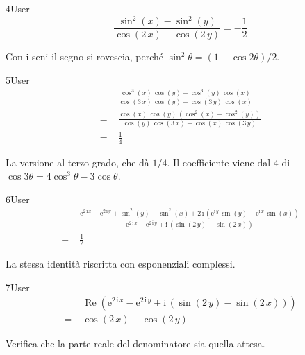 \begin{espr}{4}{User}{\verificata}
\[
\frac{\sin^{2}\!\left(x\right) - \sin^{2}\!\left(y\right)}{\cos\!\left(2\, x\right) - \cos\!\left(2\, y\right)} = -\frac{1}{2}
\]
\end{espr}
Con i seni il segno si rovescia, perché $\sin^2\theta=(1-\cos2\theta)/2$.

\begin{espr}{5}{User}{\verificata}
\begin{align*}
& \frac{\cos^{3}\!\left(x\right)\, \cos\!\left(y\right) - \cos^{3}\!\left(y\right)\, \cos\!\left(x\right)}{\cos\!\left(3\, x\right)\, \cos\!\left(y\right) - \cos\!\left(3\, y\right)\, \cos\!\left(x\right)} \\
=\;& \frac{\cos\!\left(x\right)\, \cos\!\left(y\right)\, \left(\cos^{2}\!\left(x\right) - \cos^{2}\!\left(y\right)\right)}{\cos\!\left(y\right)\, \cos\!\left(3\, x\right) - \cos\!\left(x\right)\, \cos\!\left(3\, y\right)} \\
=\;& \frac{1}{4}
\end{align*}
\end{espr}
La versione al terzo grado, che dà $1/4$. Il coefficiente viene dal $4$ di $\cos3\theta=4\cos^3\theta-3\cos\theta$.

\begin{espr}{6}{User}{\verificata}
\begin{align*}
& \frac{\mathrm{e}^{2\, \mathrm{i}\, x} - \mathrm{e}^{2\, \mathrm{i}\, y} + \sin^{2}\!\left(y\right) - \sin^{2}\!\left(x\right) + 2\, \mathrm{i}\, \left(\mathrm{e}^{\mathrm{i}\, y}\, \sin\!\left(y\right) - \mathrm{e}^{\mathrm{i}\, x}\, \sin\!\left(x\right)\right)}{\mathrm{e}^{2\, \mathrm{i}\, x} - \mathrm{e}^{2\, \mathrm{i}\, y} + \mathrm{i}\, \left(\sin\!\left(2\, y\right) - \sin\!\left(2\, x\right)\right)} \\
=\;& \frac{1}{2}
\end{align*}
\end{espr}
La stessa identità riscritta con esponenziali complessi.

\begin{espr}{7}{User}{}
\begin{align*}
& \operatorname{Re}\!\left(\mathrm{e}^{2\, \mathrm{i}\, x} - \mathrm{e}^{2\, \mathrm{i}\, y} + \mathrm{i}\, \left(\sin\!\left(2\, y\right) - \sin\!\left(2\, x\right)\right)\right) \\
=\;& \cos\!\left(2\, x\right) - \cos\!\left(2\, y\right)
\end{align*}
\end{espr}
Verifica che la parte reale del denominatore sia quella attesa.

